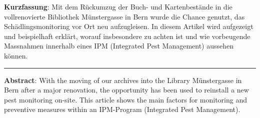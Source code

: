 \textbf{Kurzfassung}: Mit dem Rückumzug der Buch- und Kartenbestände in
die vollrenovierte Bibliothek Münstergasse in Bern wurde die Chance
genutzt, das Schädlingsmonitoring vor Ort neu aufzugleisen. In diesem
Artikel wird aufgezeigt und beispielhaft erklärt, worauf insbesondere zu
achten ist und wie vorbeugende Massnahmen innerhalb eines IPM
(Integrated Pest Management) aussehen können.

\begin{center}\rule{0.5\linewidth}{0.5pt}\end{center}

\textbf{Abstract}: With the moving of our archives into the Library
Münstergasse in Bern after a major renovation, the opportunity has been
used to reinstall a new pest monitoring on-site. This article shows the
main factors for monitoring and preventive measures within an
IPM-Program (Integrated Pest Management).
